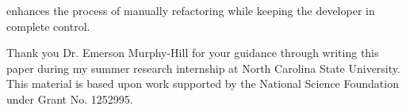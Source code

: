 \documentclass{sigplanconf}
\begin{document}
\pname{} enhances the process of manually refactoring while keeping the
developer in complete control.

\appendix
% 

\acks
Thank you Dr. Emerson Murphy-Hill for your guidance through writing this
paper during my summer research internship at North Carolina State University.
This material is based upon work supported by the National Science Foundation
under Grant No. 1252995.





\softraggedright

\end{document}
